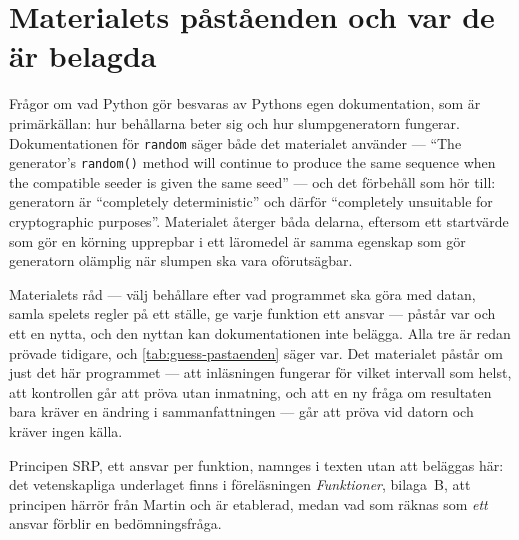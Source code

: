 \section{Materialets påståenden och var de är belagda}
\label{sec:guess-pastaenden}

Frågor om vad Python gör besvaras av Pythons egen dokumentation, som är
primärkällan: hur behållarna beter
sig\autocite{PythonDataStructures} och hur slumpgeneratorn
fungerar\autocite{PythonRandom}.  Dokumentationen för
\texttt{random} säger både det materialet använder ---
\enquote{The generator's \texttt{random()} method will
continue to produce the same sequence when the compatible
seeder is given the same seed} --- och det förbehåll som hör till:
generatorn är \enquote{completely deterministic} och därför
\enquote{completely unsuitable for cryptographic purposes}.  Materialet
återger båda delarna, eftersom ett startvärde som gör en körning
upprepbar i ett läromedel är samma egenskap som gör generatorn
olämplig när slumpen ska vara oförutsägbar.

Materialets råd --- välj behållare efter vad programmet ska göra med
datan, samla spelets regler på ett ställe, ge varje funktion ett ansvar
--- påstår var och ett en nytta, och den nyttan kan dokumentationen inte
belägga.  Alla tre är redan prövade tidigare, och
\cref{tab:guess-pastaenden} säger var.  Det materialet påstår om just
det här programmet --- att inläsningen fungerar för vilket intervall som
helst, att kontrollen går att pröva utan inmatning, och att en ny fråga
om resultaten bara kräver en ändring i sammanfattningen --- går att
pröva vid datorn och kräver ingen källa.

Principen SRP, ett ansvar per funktion, namnges i texten utan att
beläggas här: det vetenskapliga underlaget finns i föreläsningen
\emph{Funktioner}, bilaga~B, att principen härrör från
Martin\autocite[ch.~8]{Martin2003Agile} och är etablerad, medan vad som
räknas som \emph{ett} ansvar förblir en bedömningsfråga.

